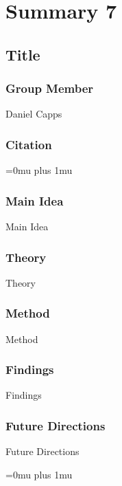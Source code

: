 \section{Summary 7}

\noindent
\subsection{Title}

\subsubsection{Group Member}

\noindent
Daniel Capps

\noindent
\subsubsection{Citation}

\Urlmuskip=0mu plus 1mu\relax

\subsubsection{Main Idea}

\noindent
Main Idea

\subsubsection{Theory}

\noindent
Theory

\subsubsection{Method}

\noindent
Method

\subsubsection{Findings}

\noindent
Findings

\subsubsection{Future Directions}

\noindent
Future Directions 

\Urlmuskip=0mu plus 1mu\relax

